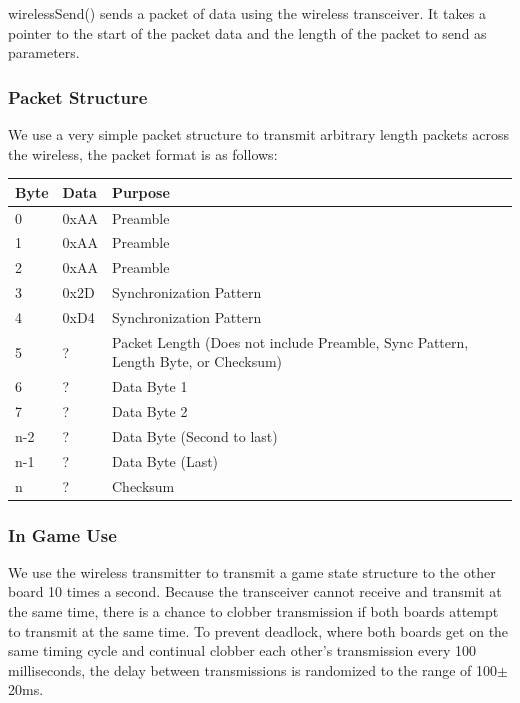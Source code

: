 \documentclass[11pt,letter,oneside]{report}
\begin{document}
wirelessSend() sends a packet of data using the wireless transceiver.  It takes a pointer to the start of the packet data and the length of the packet to send as parameters.  

\subsubsection{Packet Structure}

We use a very simple packet structure to transmit arbitrary length packets across the wireless, the packet format is as follows:  

\begin{table}[h]
\begin{center}
\begin{tabular}{| l | l | l | }
\hline
Byte & Data & Purpose \\ \hline \hline \hline
0 & 0xAA & Preamble \\ \hline 
1 & 0xAA & Preamble \\ \hline 
2 & 0xAA & Preamble \\ \hline 
3 & 0x2D & Synchronization Pattern \\ \hline 
4 & 0xD4 & Synchronization Pattern \\ \hline 
5 & ? & Packet Length (Does not include Preamble, Sync Pattern, Length Byte, or Checksum) \\ \hline 
6 & ? & Data Byte 1 \\ \hline 
7 & ? & Data Byte 2 \\ \hline 
n-2 & ? & Data Byte (Second to last)\\ \hline 
n-1 & ? & Data Byte (Last) \\ \hline 
n & ? & Checksum \\ \hline 
\end{tabular}
\label{tab:buttonFunctions}
\end{center}
\end{table}

\subsubsection{In Game Use}
We use the wireless transmitter to transmit a game state structure to the other board 10 times a second.  Because the transceiver cannot receive and transmit at the same time, there is a chance to clobber transmission if both boards attempt to transmit at the same time.  To prevent deadlock, where both boards get on the same timing cycle and continual clobber each other's transmission every 100 milliseconds, the delay between transmissions is randomized to the range of 100$\pm$20ms.  
\end{document}
